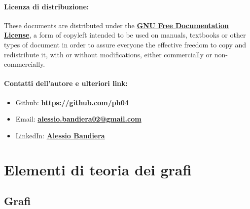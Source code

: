 \documentclass[a4paper, 12pt]{report}
\begin{document}
    \quad

    \subsubsection{Licenza di distribuzione:}
    
    These documents are distributed under the \textbf{\href{https://www.gnu.org/licenses/fdl-1.3.txt}{GNU Free Documentation License}}, a form of copyleft intended to be used on manuals, textbooks or other types of document in order to assure everyone the effective freedom to copy and redistribute it, with or without modifications, either commercially or non-commercially.
    
    \quad

    \subsubsection{Contatti dell'autore e ulteriori link:}
    \begin{itemize}


        \item Github: \textbf{\href{https://github.com/ph04}{https://github.com/ph04}}
        \item Email: \textbf{\href{mailto:alessio.bandiera02@gmail.com}{alessio.bandiera02@gmail.com}}
        \item LinkedIn: \textbf{\href{https://www.linkedin.com/in/alessio-bandiera-a53767223/}{Alessio Bandiera}}
    \end{itemize}


    \chapter{Elementi di teoria dei grafi}

    \section{Grafi}
\end{document}
